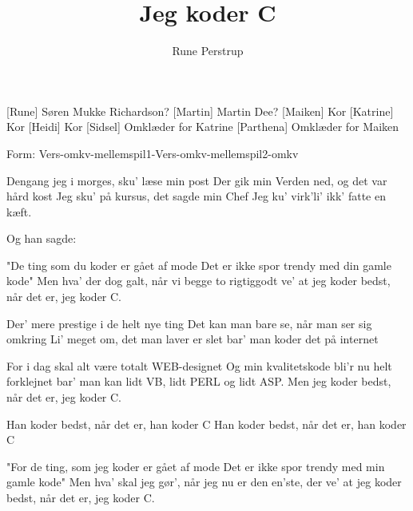 \documentclass[danish]{article}
\title{Jeg koder C}
\author{Rune Perstrup}
\begin{document}
\maketitle

\begin{roles}
  [Rune] Søren Mukke Richardson?
  [Martin] Martin Dee?
  [Maiken] Kor
  [Katrine] Kor
  [Heidi] Kor
  [Sidsel] Omklæder for Katrine
  [Parthena] Omklæder for Maiken
\end{roles}

Form: Vers-omkv-mellemspil1-Vers-omkv-mellemspil2-omkv

\begin{song}
 Dengang jeg i morges, sku' læse min post
Der gik min Verden ned, og det var hård kost
Jeg sku' på kursus, det sagde min Chef
Jeg ku' virk'li' ikk' fatte en kæft.

 Og han sagde:

 "De ting som du koder er gået af mode
Det er ikke spor trendy med din gamle kode"
Men hva' der dog galt, når vi begge to rigtiggodt ve'
at jeg koder bedst, når det er, jeg koder C.

 Der' mere prestige i de helt nye ting
Det kan man bare se, når man ser sig omkring
Li' meget om, det man laver er slet
bar' man koder det på internet

 For i dag skal alt være totalt WEB-designet
Og min kvalitetskode bli'r nu helt forklejnet
bar' man kan lidt VB, lidt PERL og lidt ASP.
Men jeg koder bedst, når det er, jeg koder C.

 Han koder bedst, når det er, han koder C
Han koder bedst, når det er, han koder C

 "For de ting, som jeg koder er gået af mode
Det er ikke spor trendy med min gamle kode"
Men hva' skal jeg gør', når jeg nu er den en'ste, der ve'
at jeg koder bedst, når det er, jeg koder C.



\end{song}
\end{document}
